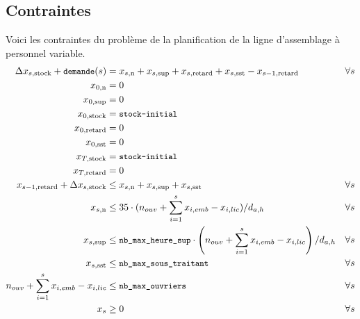 \documentclass[12pt,oneside,a4paper]{article}
\newcommand{\myX}[2]{x_{#1,\text{#2}}}
\newcommand{\xSemaine}[1]{\myX{s}{#1}}
\newcommand{\xn}{\xSemaine{n}}
\newcommand{\xsup}{\xSemaine{sup}}
\newcommand{\xstock}{\xSemaine{stock}}
\newcommand{\xretard}{\xSemaine{retard}}
\newcommand{\xsst}{\xSemaine{sst}}
\newcommand{\texttts}[1]{{\small\texttt{#1}}}
\begin{document}
\subsection*{Contraintes}
Voici les contraintes du problème de la planification 
de la ligne d’assemblage à personnel variable.
\begin{align*}
  \Delta\xstock + \texttts{demande}(s) &= \xn + \xsup 
  + \xretard + \xsst - \myX{s-1}{retard} &\forall s \\
  \myX{0}{n}&= 0 \\
  \myX{0}{sup}&= 0 \\
  \myX{0}{stock} &= \texttts{stock-initial} \\
  \myX{0}{retard}&= 0 \\
  \myX{0}{sst}&= 0 \\
  \myX{T}{stock} &= \texttts{stock-initial} \\
  \myX{T}{retard}&= 0 \\
  \myX{s-1}{retard} + \Delta\xstock &\leq \xn + \xsup + \xsst &\forall s \\
  \xn &\leq 35\cdot (n_{ouv} + \sum_{i=1}^{s} x_{i,emb} - x_{i,lic})/ d_{a,h}
  &\forall s \\
  \xsup &\leq \texttts{nb\_max\_heure\_sup}\cdot \left(n_{ouv} + \sum_{i=1}^{s} x_{i,emb} - x_{i,lic} \right)/ d_{a,h}
  &\forall s \\
  \xsst &\leq \texttts{nb\_max\_sous\_traitant} &\forall s \\
  n_{ouv} + \sum_{i=1}^{s} x_{i,emb} - x_{i,lic} &\leq \texttts{nb\_max\_ouvriers}  &\forall s \\
  x_s &\geq 0 &\forall s
\end{align*}
\end{document}
